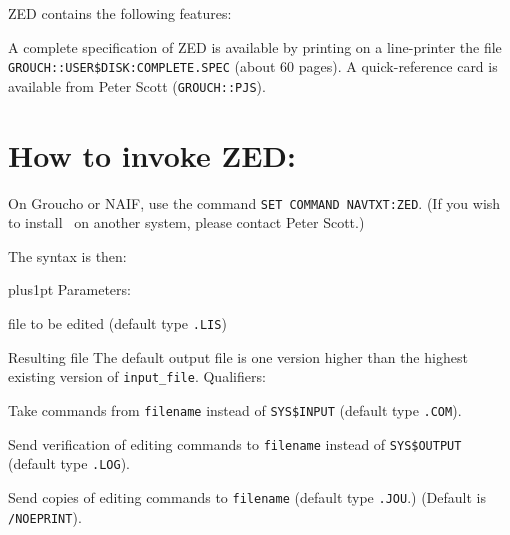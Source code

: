 ZED contains the following features:
\medskip
{}

A complete specification of ZED is available by printing on a line-printer
the file {\tt GROUCH::\-USER\$\-DISK:COMPLETE.SPEC} (about 60 pages).
A quick-reference card is available from Peter Scott ({\tt GROUCH::PJS}).
\vfill\eject
\section{How to invoke ZED:}

On Groucho or NAIF, use the command {\tt SET COMMAND NAVTXT:ZED}\null.
(If you wish to install \ZED\ on another system, please contact
Peter Scott.)

The syntax is then:

{\parskip3pt plus1pt
\smallskip
Parameters:


\qquad file to be edited (default type {\tt .LIS})


\qquad Resulting file
\smallskip
The default output file is one version higher than the highest existing
version of {\tt input\_file}.
\medskip
Qualifiers:


\qquad Take commands from {\tt filename} instead of {\tt SYS\$INPUT}
(default type {\tt .COM}).


\qquad Send verification of editing commands to {\tt filename}
instead of {\tt SYS\$OUTPUT} (default type {\tt .LOG}).


\qquad Send copies of editing commands to {\tt filename} (default
type {\tt .JOU}.)
(Default is {\tt /NOEPRINT}).

}


